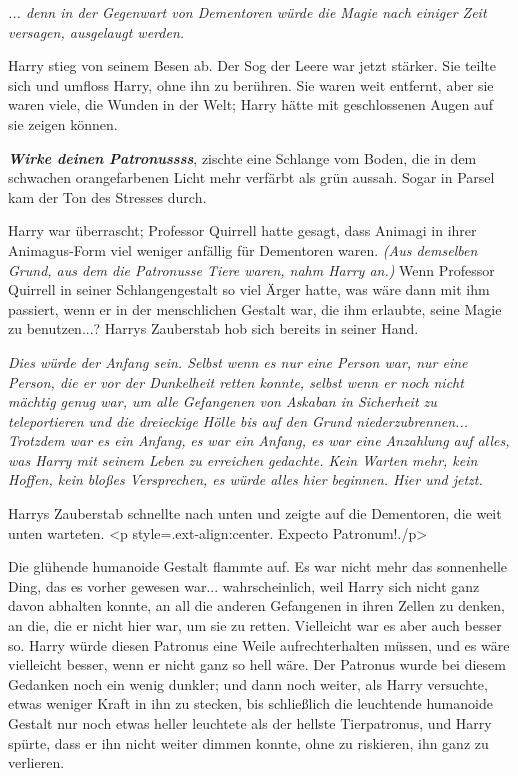 \emph{... denn in der Gegenwart von Dementoren würde die Magie nach einiger
Zeit versagen, ausgelaugt werden.}

Harry stieg von seinem Besen ab. Der Sog der Leere war jetzt stärker. Sie teilte
sich und umfloss Harry, ohne ihn zu berühren. Sie waren weit entfernt, aber sie
waren viele, die Wunden in der Welt; Harry hätte mit geschlossenen Augen auf sie
zeigen können.

\glqq \textbf{\emph{Wirke deinen Patronussss}}\grqq{}, zischte eine Schlange vom
Boden, die in dem schwachen orangefarbenen Licht mehr verfärbt als grün aussah.
Sogar in Parsel kam der Ton des Stresses durch.

Harry war überrascht; Professor Quirrell hatte gesagt, dass Animagi in ihrer
Animagus-Form viel weniger anfällig für Dementoren waren.\emph{ (Aus demselben
Grund, aus dem die Patronusse Tiere waren, nahm Harry an.)} Wenn Professor
Quirrell in seiner Schlangengestalt so viel Ärger hatte, was wäre dann mit ihm
passiert, wenn er in der menschlichen Gestalt war, die ihm erlaubte, seine Magie
zu benutzen...? Harrys Zauberstab hob sich bereits in seiner Hand.

\emph{Dies würde der Anfang sein. Selbst wenn es nur eine Person war, nur eine
Person, die er vor der Dunkelheit retten konnte, selbst wenn er noch nicht
mächtig genug war, um alle Gefangenen von Askaban in Sicherheit zu teleportieren
und die dreieckige Hölle bis auf den Grund niederzubrennen... Trotzdem war es
ein Anfang, }\emph{es war ein Anfang, es war eine Anzahlung auf alles, was Harry
mit seinem Leben zu erreichen gedachte. Kein Warten mehr, kein Hoffen, kein
bloßes Versprechen, es würde alles hier beginnen. Hier und jetzt.}

Harrys Zauberstab schnellte nach unten und zeigte auf die Dementoren, die weit
unten warteten. <p style=\grqq{}.ext-align:center\grqq{}. \glqq Expecto
Patronum!\grqq{}./p>

Die glühende humanoide Gestalt flammte auf. Es war nicht mehr das sonnenhelle
Ding, das es vorher gewesen war... wahrscheinlich, weil Harry sich nicht ganz
davon abhalten konnte, an all die anderen Gefangenen in ihren Zellen zu denken,
an die, die er nicht hier war, um sie zu retten. Vielleicht war es aber auch
besser so. Harry würde diesen Patronus eine Weile aufrechterhalten müssen, und
es wäre vielleicht besser, wenn er nicht ganz so hell wäre. Der Patronus wurde
bei diesem Gedanken noch ein wenig dunkler; und dann noch weiter, als Harry
versuchte, etwas weniger Kraft in ihn zu stecken, bis schließlich die leuchtende
humanoide Gestalt nur noch etwas heller leuchtete als der hellste Tierpatronus,
und Harry spürte, dass er ihn nicht weiter dimmen konnte, ohne zu riskieren, ihn
ganz zu verlieren.

